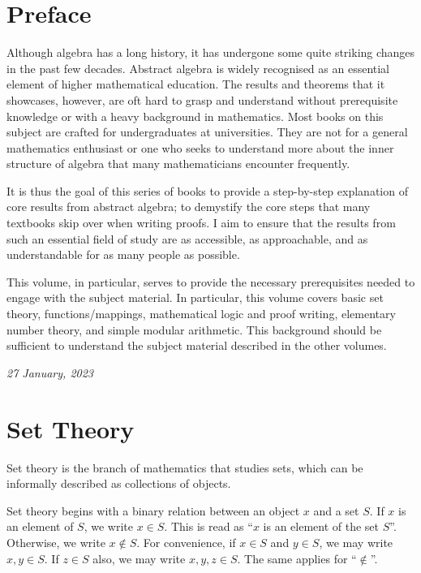 \newpage

\chapter*{Preface}
Although algebra has a long history, it has undergone some quite striking changes in the past few decades. Abstract algebra is widely recognised as an essential element of higher mathematical education. The results and theorems that it showcases, however, are oft hard to grasp and understand without prerequisite knowledge or with a heavy background in mathematics. Most books on this subject are crafted for undergraduates at universities. They are not for a general mathematics enthusiast or one who seeks to understand more about the inner structure of algebra that many mathematicians encounter frequently.

It is thus the goal of this series of books to provide a step-by-step explanation of core results from abstract algebra; to demystify the core steps that many textbooks skip over when writing proofs. I aim to ensure that the results from such an essential field of study are as accessible, as approachable, and as understandable for as many people as possible.

This volume, in particular, serves to provide the necessary prerequisites needed to engage with the subject material. In particular, this volume covers basic set theory, functions/mappings, mathematical logic and proof writing, elementary number theory, and simple modular arithmetic. This background should be sufficient to understand the subject material described in the other volumes.

\hfill{\textit{27 January, 2023}}
\newpage

\tableofcontents
\setcounter{part}{0}

\chapter{Set Theory}
Set theory is the branch of mathematics that studies sets, which can be informally described as collections of objects.

Set theory begins with a binary relation between an object $x$ and a set $S$. If $x$ is an element of $S$, we write $x \in S$. This is read as ``$x$ is an element of the set $S$''. Otherwise, we write $x \notin S$. For convenience, if $x \in S$ and $y \in S$, we may write $x, y \in S$. If $z \in S$ also, we may write $x, y, z \in S$. The same applies for ``$\notin$''.

